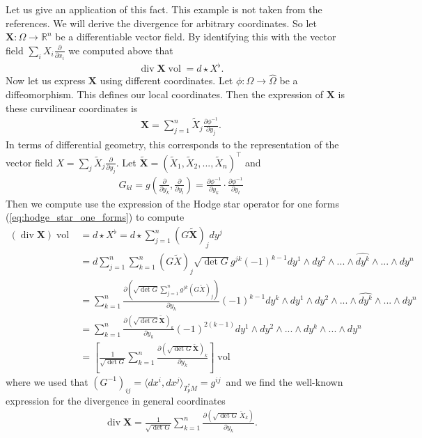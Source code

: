 \documentclass[12pt,a4paper]{article}
\numberwithin{equation}{subsection}
\numberwithin{lemma}{subsection}
\theoremstyle{definition}
\DeclareMathOperator{\diver}{div}
\DeclareMathOperator{\vol}{vol}
\newcommand{\real}{\mathbb{R}}
\begin{document}
Let us give an application of this fact. This example is not taken from the 
references. We will derive the divergence for arbitrary coordinates. 
So let $\mathbf{X}: \Omega \rightarrow \real^n$ be a differentiable vector field. By 
identifying this with the vector field $\sum_i X_i \frac{\partial}{\partial x_i}
$ we computed above that 
\begin{align*}
    \diver \mathbf{X} \vol = d \star X^\flat.
\end{align*}
Now let us express $\mathbf{X}$ using different coordinates. 
Let $\phi: \Omega \rightarrow \hat{\Omega}$ be a diffeomorphism. 
This defines our local coordinates. Then the expression of $\mathbf{X}$ is
these curvilinear coordinates is
\begin{align*}
    \mathbf{X} = \sum_{j=1}^n \tilde{X}_j 
        \frac{\partial \phi^{-1}}{\partial y_j}.
\end{align*}
In terms of differential geometry, this corresponds to the representation of the vector field 
$X = \sum_j \tilde{X}_j \frac{\partial}{\partial y_j}$. 
Let $\tilde{\mathbf{X}} = (\tilde{X}_1, \tilde{X}_2, ..., \tilde{X}_n)^\top$ 
and 
\begin{align*}
    G_{kl} = g(\frac{\partial}{\partial y_k}, \frac{\partial}{\partial y_l})
        = \frac{\partial \phi^{-1}}{\partial y_k} \cdot 
            \frac{\partial \phi^{-1}}{\partial y_l}
\end{align*}
Then we compute use the expression of the Hodge star operator 
for one forms (\ref{eq:hodge_star_one_forms}) to compute
\begin{align*}
    (\diver \mathbf{X}) \vol 
    &= d \star X^\flat 
    = d \star \sum_{j=1}^n (G \tilde{\mathbf{X}})_j dy^j 
    \\ &= d \sum_{j=1}^n \sum_{k=1}^n (G \tilde{X})_j 
        \sqrt{ \det G} g^{jk} (-1)^{k-1} dy^1 \wedge dy^2 \wedge ... \wedge 
        \widehat{dy^k} \wedge ... \wedge dy^n 
    \\ &= \sum_{k=1}^n \frac{\partial
        (\sqrt{ \det G} \sum_{j=1}^n g^{jk} (G \tilde{X})_j )}
        {\partial y_k} (-1)^{k-1} dy^k \wedge dy^1 \wedge dy^2 \wedge ... \wedge 
        \widehat{dy^k} \wedge ... \wedge dy^n 
    \\ &= \sum_{k=1}^n \frac{\partial (\sqrt{ \det G}  \tilde{\mathbf{X}})_k }
        {\partial y_k} (-1)^{2(k-1)} dy^1 \wedge dy^2 \wedge ... \wedge 
        dy^k \wedge ... \wedge dy^n
    \\ &= \left[ \frac{1}{\sqrt{ \det G}} \sum_{k=1}^n 
        \frac{\partial (\sqrt{ \det G}  \tilde{\mathbf{X}})_k }{\partial y_k}
        \right] \vol
\end{align*}
where we used that $(G^{-1})_{ij} = \langle dx^i, dx^j \rangle_{T^*_p M} = g^{ij}$\
and we find the well-known expression for the divergence in general coordinates
\begin{align*}
    \diver \mathbf{X} = \frac{1}{\sqrt{ \det G}} \sum_{k=1}^n 
        \frac{\partial (\sqrt{ \det G} \, \tilde{X}_k )}{\partial y_k}.
\end{align*}
\end{document}
